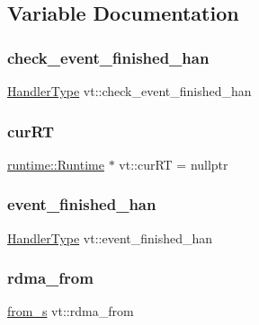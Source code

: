\subsection{Variable Documentation}
\mbox{\label{namespacevt_a9764c5fa4f463d23a7db5d56cc121881}} 
\subsubsection{\texorpdfstring{check\+\_\+event\+\_\+finished\+\_\+han}{check\_event\_finished\_han}}
{\footnotesize\ttfamily \hyperlink{namespacevt_af64846b57dfcaf104da3ef6967917573}{Handler\+Type} vt\+::check\+\_\+event\+\_\+finished\+\_\+han}

\mbox{\label{namespacevt_a07abc8f1752a784f54c226bbc4c3b1fe}} 
\subsubsection{\texorpdfstring{cur\+RT}{curRT}}
{\footnotesize\ttfamily \hyperlink{structvt_1_1runtime_1_1_runtime}{runtime\+::\+Runtime} $\ast$ vt\+::cur\+RT = nullptr}

\mbox{\label{namespacevt_a570bc5403031e45a957476ffae6f67c1}} 
\subsubsection{\texorpdfstring{event\+\_\+finished\+\_\+han}{event\_finished\_han}}
{\footnotesize\ttfamily \hyperlink{namespacevt_af64846b57dfcaf104da3ef6967917573}{Handler\+Type} vt\+::event\+\_\+finished\+\_\+han}

\mbox{\label{namespacevt_ae446ed1f5bb8bba34af5c747ea1f244d}} 
\subsubsection{\texorpdfstring{rdma\+\_\+from}{rdma\_from}}
{\footnotesize\ttfamily \hyperlink{structvt_1_1from__s}{from\+\_\+s} vt\+::rdma\+\_\+from}

